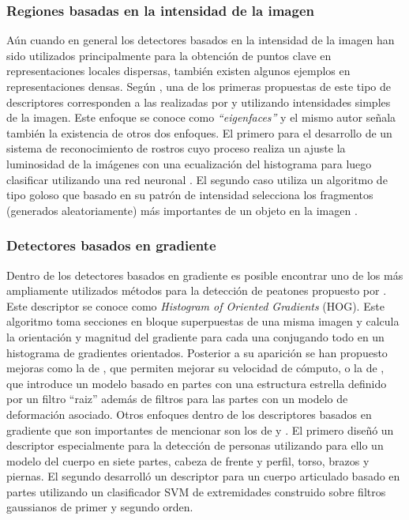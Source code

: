 \subsubsection{Regiones basadas en la intensidad de la imagen}

Aún cuando en general los detectores basados en la intensidad de la imagen han sido utilizados principalmente para la obtención de puntos clave en representaciones locales dispersas, también existen algunos ejemplos en representaciones densas. Según \cite{dalal2006}, una de los primeras propuestas de este tipo de descriptores corresponden a las realizadas por \cite{Sirovich1987} y \cite{Turk1991} utilizando intensidades simples de la imagen. Este enfoque se conoce como \textit{``eigenfaces''} y el mismo autor señala también la existencia de otros dos enfoques. El primero para el desarrollo de un sistema de reconocimiento de rostros cuyo proceso realiza un ajuste  la luminosidad de la imágenes con una ecualización del histograma para luego clasificar utilizando una red neuronal \citep{Rowley1998}. El segundo caso utiliza un algoritmo de tipo goloso que basado en su patrón de intensidad selecciona los fragmentos (generados aleatoriamente) más importantes de un objeto en la imagen \citep{Ullman2001}.

\subsubsection{Detectores basados en gradiente}

Dentro de los detectores basados en gradiente es posible encontrar uno de los más ampliamente utilizados métodos para la detección de peatones propuesto por \cite{dalal2005}. Este descriptor se conoce como \textit{Histogram of Oriented Gradients} (HOG). Este algoritmo toma secciones en bloque superpuestas de una misma imagen y calcula la orientación y magnitud del gradiente para cada una conjugando todo en un histograma de gradientes orientados. Posterior a su aparición se han propuesto mejoras como la de \cite{Zhu2006}, que permiten mejorar su velocidad de cómputo, o la de \cite{Felzenszwalb2009}, que introduce un modelo basado en partes con una estructura estrella definido por un filtro ``raiz'' además de filtros para las partes con un modelo de deformación asociado. Otros enfoques dentro de los descriptores basados en gradiente que son importantes de mencionar son los de \cite{Mikolajczyk2004a} y \cite{Ronfard2002}. El primero diseñó un descriptor especialmente para la detección de personas utilizando para ello un modelo del cuerpo en siete partes, cabeza de frente y perfil, torso, brazos y piernas. El segundo desarrolló un descriptor para un cuerpo articulado basado en partes utilizando un clasificador SVM de extremidades construido sobre filtros gaussianos de primer y segundo orden.

